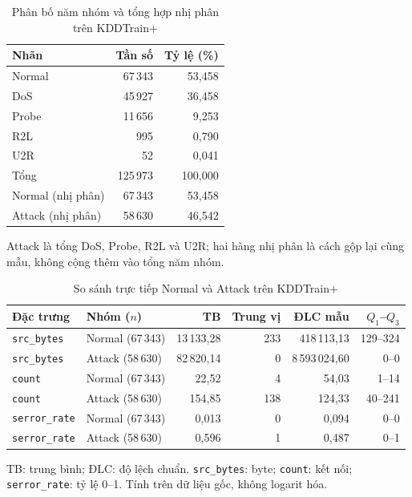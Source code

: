 \documentclass[../main.tex]{subfiles}
\begin{document}
\begin{table}[H]
\centering
\caption{Phân bố năm nhóm và tổng hợp nhị phân trên KDDTrain+}
\label{tab:t2:labels}
\small
\setlength{\tabcolsep}{3pt}
\begin{tabular}{lrr}
\toprule
Nhãn & Tần số & Tỷ lệ (\%) \\
\midrule
Normal & 67\,343 & 53,458 \\
DoS & 45\,927 & 36,458 \\
Probe & 11\,656 & 9,253 \\
R2L & 995 & 0,790 \\
U2R & 52 & 0,041 \\
\midrule Tổng & 125\,973 & 100,000 \\
\midrule Normal (nhị phân) & 67\,343 & 53,458 \\
Attack (nhị phân) & 58\,630 & 46,542 \\
\bottomrule
\end{tabular}
\par\smallskip\footnotesize Attack là tổng DoS, Probe, R2L và U2R; hai hàng nhị phân là cách gộp lại cùng mẫu, không cộng thêm vào tổng năm nhóm.
\end{table}

\begin{table}[H]
\centering
\caption{So sánh trực tiếp Normal và Attack trên KDDTrain+}
\label{tab:t2:comparison}
\small
\setlength{\tabcolsep}{3pt}
\begin{tabular}{llrrrr}
\toprule
Đặc trưng & Nhóm ($n$) & TB & Trung vị & ĐLC mẫu & $Q_1$--$Q_3$ \\
\midrule
\texttt{src\_bytes} & Normal (67\,343) & 13\,133,28 & 233 & 418\,113,13 & 129--324 \\
\texttt{src\_bytes} & Attack (58\,630) & 82\,820,14 & 0 & 8\,593\,024,60 & 0--0 \\
\texttt{count} & Normal (67\,343) & 22,52 & 4 & 54,03 & 1--14 \\
\texttt{count} & Attack (58\,630) & 154,85 & 138 & 124,33 & 40--241 \\
\texttt{serror\_rate} & Normal (67\,343) & 0,013 & 0 & 0,094 & 0--0 \\
\texttt{serror\_rate} & Attack (58\,630) & 0,596 & 1 & 0,487 & 0--1 \\
\bottomrule
\end{tabular}
\par\smallskip\footnotesize TB: trung bình; ĐLC: độ lệch chuẩn. \texttt{src\_bytes}: byte; \texttt{count}: kết nối; \texttt{serror\_rate}: tỷ lệ 0--1. Tính trên dữ liệu gốc, không logarit hóa.
\end{table}
\end{document}
